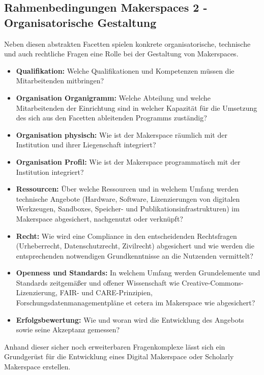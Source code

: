 \documentclass[a4paper,
fontsize=11pt,
oneside,
numbers=noperiodatend,
parskip=half-,
bibliography=totoc,
final
]{scrartcl}
\begin{document}
\hypertarget{rahmenbedingungen-makerspaces-2---organisatorische-gestaltung}{%
\subsection{Rahmenbedingungen Makerspaces 2 - Organisatorische
Gestaltung}\label{rahmenbedingungen-makerspaces-2---organisatorische-gestaltung}}

Neben diesen abstrakten Facetten spielen konkrete organisatorische,
technische und auch rechtliche Fragen eine Rolle bei der Gestaltung von
Makerspaces.

\begin{itemize}
\item
  \textbf{Qualifikation:} Welche Qualifikationen und Kompetenzen müssen
  die Mitarbeitenden mitbringen?
\item
  \textbf{Organisation Organigramm:} Welche Abteilung und welche
  Mitarbeitenden der Einrichtung sind in welcher Kapazität für die
  Umsetzung des sich aus den Facetten ableitenden Programms zuständig?
\item
  \textbf{Organisation physisch:} Wie ist der Makerspace räumlich mit
  der Institution und ihrer Liegenschaft integriert?
\item
  \textbf{Organisation Profil:} Wie ist der Makerspace programmatisch
  mit der Institution integriert?
\item
  \textbf{Ressourcen:} Über welche Ressourcen und in welchem Umfang
  werden technische Angebote (Hardware, Software, Lizenzierungen von
  digitalen Werkzeugen, Sandboxes, Speicher- und
  Publikationsinfrastrukturen) im Makerspace abgesichert, nachgenutzt
  oder verknüpft?
\item
  \textbf{Recht:} Wie wird eine Compliance in den entscheidenden
  Rechtsfragen (Urheberrecht, Datenschutzrecht, Zivilrecht) abgesichert
  und wie werden die entsprechenden notwendigen Grundkenntnisse an die
  Nutzenden vermittelt?
\item
  \textbf{Openness und Standards:} In welchem Umfang werden
  Grundelemente und Standards zeitgemäßer und offener Wissenschaft wie
  Creative-Commons-Lizenzierung, FAIR- und CARE-Prinzipien,
  Forschungsdatenmanagementpläne et cetera im Makerspace wie
  abgesichert?
\item
  \textbf{Erfolgsbewertung:} Wie und woran wird die Entwicklung des
  Angebots sowie seine Akzeptanz gemessen?
\end{itemize}

Anhand dieser sicher noch erweiterbaren Fragenkomplexe lässt sich ein
Grundgerüst für die Entwicklung eines Digital Makerspace oder Scholarly
Makerspace erstellen.
\end{document}
